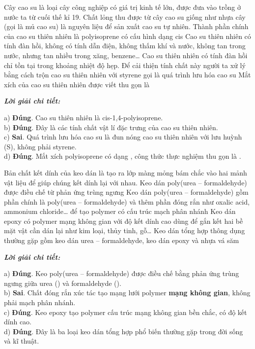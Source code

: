 \documentclass[11pt,a4paper]{article}
\def\loigiai#1{
\par\begingroup\color{blue!80!black}\small
\noindent\textbf{\textit{Lời giải chi tiết:}}\par
#1\par\endgroup}
\begin{document}
\begin{ex}
Cây cao su là loại cây công nghiệp có giá trị kinh tế lớn, được đưa vào trồng ở nước ta từ cuối thế kỉ 19. Chất lỏng thu được từ cây cao su giống như nhựa cây (gọi là mủ cao su) là nguyên liệu để sản xuất cao su tự nhiên.
\choiceTF
{\True Thành phần chính của cao su thiên nhiên là polyisoprene có cấu hình dạng cis}
{\True Cao su thiên nhiên có tính đàn hồi, không có tính dẫn điện, không thấm khí và nước, không tan trong nước, nhưng tan nhiều trong xăng, benzene\dots}
{Cao su thiên nhiên có tính đàn hồi chỉ tồn tại trong khoảng nhiệt độ hẹp. Để cải thiện tính chất này người ta xử lý bằng cách trộn cao su thiên nhiên với styrene gọi là quá trình lưu hóa cao su}
{\True Mắt xích của cao su thiên nhiên được viết thu gọn là }
\loigiai{
a) \textbf{Đúng}. Cao su thiên nhiên là cis-1,4-polyisoprene.\\
b) \textbf{Đúng}. Đây là các tính chất vật lí đặc trưng của cao su thiên nhiên.\\
c) \textbf{Sai}. Quá trình lưu hóa cao su là đun nóng cao su thiên nhiên với lưu huỳnh (S), không phải styrene.\\
d) \textbf{Đúng}. Mắt xích polyisoprene có dạng \ce{[-CH2-C(CH3)=CH-CH2-]}, công thức thực nghiệm thu gọn là \ce{C5H8}.}
\end{ex}

\begin{ex}
Bản chất kết dính của keo dán là tạo ra lớp màng mỏng bám chắc vào hai mảnh vật liệu để giúp chúng kết dính lại với nhau.
\choiceTF
{\True Keo dán poly(urea -- formaldehyde) được điều chế từ phản ứng trùng ngưng}
{Keo dán poly(urea -- formaldehyde) gồm phần chính là poly(urea -- formaldehyde) và thêm phần đóng rắn như oxalic acid, ammonium chloride\dots{} để tạo polymer có cấu trúc mạch phân nhánh}
{\True Keo dán epoxy có polymer mạng không gian với độ kết dính cao dùng để gắn kết hai bề mặt vật cần dán lại như kim loại, thủy tinh, gỗ\dots}
{\True Keo dán tổng hợp thông dụng thường gặp gồm keo dán urea -- formaldehyde, keo dán epoxy và nhựa vá săm}
\loigiai{
a) \textbf{Đúng}. Keo poly(urea -- formaldehyde) được điều chế bằng phản ứng trùng ngưng giữa urea (\ce{NH2-CO-NH2}) và formaldehyde (\ce{HCHO}).\\
b) \textbf{Sai}. Chất đóng rắn xúc tác tạo mạng lưới polymer \textbf{mạng không gian}, không phải mạch phân nhánh.\\
c) \textbf{Đúng}. Keo epoxy tạo polymer cấu trúc mạng không gian bền chắc, có độ kết dính cao.\\
d) \textbf{Đúng}. Đây là ba loại keo dán tổng hợp phổ biến thường gặp trong đời sống và kĩ thuật.}
\end{ex}
\end{document}
